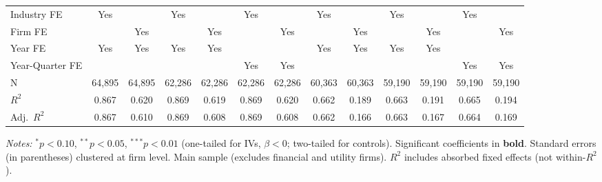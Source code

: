 \documentclass[11pt,a4paper]{article}
\begin{document}
\begin{table}[htbp]
\begin{tabular}{lcccccccccccc}
Industry FE & Yes &  & Yes &  & Yes &  & Yes &  & Yes &  & Yes &  \\
Firm FE &  & Yes &  & Yes &  & Yes &  & Yes &  & Yes &  & Yes \\
Year FE & Yes & Yes & Yes & Yes &  &  & Yes & Yes & Yes & Yes &  &  \\
Year-Quarter FE &  &  &  &  & Yes & Yes &  &  &  &  & Yes & Yes \\
\midrule
N & 64,895 & 64,895 & 62,286 & 62,286 & 62,286 & 62,286 & 60,363 & 60,363 & 59,190 & 59,190 & 59,190 & 59,190 \\
$R^2$ & 0.867 & 0.620 & 0.869 & 0.619 & 0.869 & 0.620 & 0.662 & 0.189 & 0.663 & 0.191 & 0.665 & 0.194 \\
Adj.~$R^2$ & 0.867 & 0.610 & 0.869 & 0.608 & 0.869 & 0.608 & 0.662 & 0.166 & 0.663 & 0.167 & 0.664 & 0.169 \\
\bottomrule
\end{tabular}
\begin{minipage}{\linewidth}
\vspace{2pt}\scriptsize
\textit{Notes:} $^{*}p<0.10$, $^{**}p<0.05$, $^{***}p<0.01$ (one-tailed for IVs, $\beta < 0$; two-tailed for controls).
 Significant coefficients in \textbf{bold}.
 Standard errors (in parentheses) clustered at firm level.
 Main sample (excludes financial and utility firms).
 $R^2$ includes absorbed fixed effects (not within-$R^2$).
\end{minipage}
\end{table}
\clearpage
\end{document}
